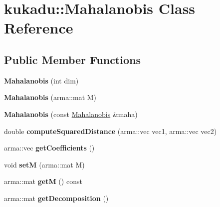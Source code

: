 \hypertarget{classkukadu_1_1Mahalanobis}{\section{kukadu\-:\-:Mahalanobis Class Reference}
\label{classkukadu_1_1Mahalanobis}
}
\subsection*{Public Member Functions}
\begin{DoxyCompactItemize}
\item 
\hypertarget{classkukadu_1_1Mahalanobis_a15f47cbf891794a56efda7d108fbd7ec}{{\bfseries Mahalanobis} (int dim)}\label{classkukadu_1_1Mahalanobis_a15f47cbf891794a56efda7d108fbd7ec}

\item 
\hypertarget{classkukadu_1_1Mahalanobis_a88c4934e79958652ed59fe146c387980}{{\bfseries Mahalanobis} (arma\-::mat M)}\label{classkukadu_1_1Mahalanobis_a88c4934e79958652ed59fe146c387980}

\item 
\hypertarget{classkukadu_1_1Mahalanobis_a1a6e0cb4e5ae21e69b719bf4352ebaf7}{{\bfseries Mahalanobis} (const \hyperlink{classkukadu_1_1Mahalanobis}{Mahalanobis} \&maha)}\label{classkukadu_1_1Mahalanobis_a1a6e0cb4e5ae21e69b719bf4352ebaf7}

\item 
\hypertarget{classkukadu_1_1Mahalanobis_a4908373882185f929f90910496d0be46}{double {\bfseries compute\-Squared\-Distance} (arma\-::vec vec1, arma\-::vec vec2)}\label{classkukadu_1_1Mahalanobis_a4908373882185f929f90910496d0be46}

\item 
\hypertarget{classkukadu_1_1Mahalanobis_ab5215c5132db0326d6cdcebca8d4473f}{arma\-::vec {\bfseries get\-Coefficients} ()}\label{classkukadu_1_1Mahalanobis_ab5215c5132db0326d6cdcebca8d4473f}

\item 
\hypertarget{classkukadu_1_1Mahalanobis_afc94f534bc63e0ff416d69a51b4b9c6f}{void {\bfseries set\-M} (arma\-::mat M)}\label{classkukadu_1_1Mahalanobis_afc94f534bc63e0ff416d69a51b4b9c6f}

\item 
\hypertarget{classkukadu_1_1Mahalanobis_a6a6db9d96a3b59c9129434a71223f3e1}{arma\-::mat {\bfseries get\-M} () const }\label{classkukadu_1_1Mahalanobis_a6a6db9d96a3b59c9129434a71223f3e1}

\item 
\hypertarget{classkukadu_1_1Mahalanobis_a65b487f0373df5c13dee4826e379fdff}{arma\-::mat {\bfseries get\-Decomposition} ()}\label{classkukadu_1_1Mahalanobis_a65b487f0373df5c13dee4826e379fdff}

\end{DoxyCompactItemize}


